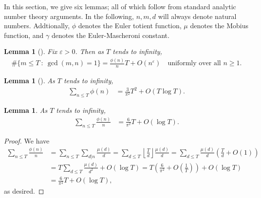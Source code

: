 \documentclass[11pt,letterpaper,reqno]{amsart}
\newtheorem{lemma}[theorem]{Lemma}
\numberwithin{equation}{section}
\numberwithin{figure}{section}
\numberwithin{table}{section}
\newcommand{\lrp}[1]{\left(#1\right)}
\newcommand{\lrfloor}[1]{\left\lfloor #1 \right\rfloor}
\begin{document}
In this section, we give six lemmas; all of which follow from standard analytic number theory arguments. 
In the following, $n,m,d$ will always denote natural numbers. Addtionally, $\phi$ denotes the Euler totient function, $\mu$ denotes the Mobius function, and $\gamma$ denotes the Euler-Mascheroni constant.
\begin{lemma}[{\cite[Theorem 8.29]{niven-zuckerman-montgomery}}] \label{lem:count-coprime-range}
    Fix $\varepsilon > 0$. Then as $T$ tends to infinity, 
    \begin{align}
        \#\{m \le T ~:~ \gcd(m,n)=1\} = \frac{\phi(n)}{n} T + O(n^{\varepsilon}) \quad \text{uniformly over all $n \ge 1$}.
    \end{align}
\end{lemma}


\begin{lemma}[{\cite[Section 8.3, Problem 19]{niven-zuckerman-montgomery}}] \label{lem:sum-phi}
    As $T$ tends to infinity, 
    \begin{align}
        \sum_{n \le T} \phi(n) &= \frac{3}{\pi^2} T^2 + O(T \log T).
    \end{align}
\end{lemma}



\begin{lemma} \label{lem:sum-phi-over-a}
    As $T$ tends to infinity, 
    \begin{align}
        \sum_{n \le T} \frac{\phi(n)}{n} &= \frac{6}{\pi^2} T + O\lrp{\log T}.
    \end{align}
\end{lemma}
\begin{proof}
    We have 
    \begin{align}
        \sum_{n \le T} \frac{\phi(n)}{n} &= \sum_{n \le T} \sum_{d|n}  \frac{\mu(d)}{d} = \sum_{d \le T} \lrfloor{\frac Td}\frac{\mu(d)}{d}  = \sum_{d \le T} \frac{\mu(d)}{d} \lrp{\frac Td + O\lrp{1} }
        \\
        &= T\sum_{d \le T} \frac{\mu(d)}{d^2} +  O\lrp{\log T}
        = T\lrp{\frac{6}{\pi^2} + O\lrp{\frac1T}}  + O\lrp{\log T} \\
        &= \frac{6}{\pi^2} T  + O\lrp{\log T},
    \end{align}
    as desired.
\end{proof}
\end{document}

